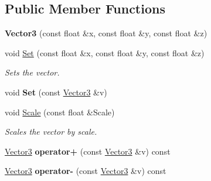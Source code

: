 \subsection*{Public Member Functions}
\begin{DoxyCompactItemize}
\item 
\hypertarget{classrcz_engine_1_1_vector3_af89b3e58a9f347736ebff46421d8ee88}{}{\bfseries Vector3} (const float \&x, const float \&y, const float \&z)\label{classrcz_engine_1_1_vector3_af89b3e58a9f347736ebff46421d8ee88}

\item 
\hypertarget{classrcz_engine_1_1_vector3_a938b5470ebfcb6b48aeda32b854d027e}{}void \hyperlink{classrcz_engine_1_1_vector3_a938b5470ebfcb6b48aeda32b854d027e}{Set} (const float \&x, const float \&y, const float \&z)\label{classrcz_engine_1_1_vector3_a938b5470ebfcb6b48aeda32b854d027e}

\begin{DoxyCompactList}\small\item\em Sets the vector. \end{DoxyCompactList}\item 
\hypertarget{classrcz_engine_1_1_vector3_a684c250fe0bb49b1c163edb2576f8d9f}{}void {\bfseries Set} (const \hyperlink{classrcz_engine_1_1_vector3}{Vector3} \&v)\label{classrcz_engine_1_1_vector3_a684c250fe0bb49b1c163edb2576f8d9f}

\item 
\hypertarget{classrcz_engine_1_1_vector3_a183f9d6205f2e104712c5f9ca079ddd4}{}void \hyperlink{classrcz_engine_1_1_vector3_a183f9d6205f2e104712c5f9ca079ddd4}{Scale} (const float \&Scale)\label{classrcz_engine_1_1_vector3_a183f9d6205f2e104712c5f9ca079ddd4}

\begin{DoxyCompactList}\small\item\em Scales the vector by scale. \end{DoxyCompactList}\item 
\hypertarget{classrcz_engine_1_1_vector3_af7f8e43c81d7eff4a75a5df2324860e5}{}\hyperlink{classrcz_engine_1_1_vector3}{Vector3} {\bfseries operator+} (const \hyperlink{classrcz_engine_1_1_vector3}{Vector3} \&v) const \label{classrcz_engine_1_1_vector3_af7f8e43c81d7eff4a75a5df2324860e5}

\item 
\hypertarget{classrcz_engine_1_1_vector3_a3ee177fcba303f15231a8f165c0ad203}{}\hyperlink{classrcz_engine_1_1_vector3}{Vector3} {\bfseries operator-\/} (const \hyperlink{classrcz_engine_1_1_vector3}{Vector3} \&v) const \label{classrcz_engine_1_1_vector3_a3ee177fcba303f15231a8f165c0ad203}


\end{DoxyCompactItemize}
